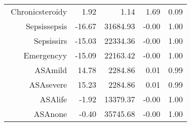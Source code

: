 \begin{tabular}{rrrrr}
$$  Chronic\-steroid\-y & 1.92 & 1.14 & 1.69 & 0.09 \\ 
  Sepsis\-sepsis & -16.67 & 31684.93 & -0.00 & 1.00 \\ 
  Sepsis\-sirs & -15.03 & 22334.36 & -0.00 & 1.00 \\ 
  Emergency\-y & -15.09 & 22163.42 & -0.00 & 1.00 \\ 
  ASA\-mild & 14.78 & 2284.86 & 0.01 & 0.99 \\ 
  ASA\-severe & 15.23 & 2284.86 & 0.01 & 0.99 \\ 
  ASA\-life & -1.92 & 13379.37 & -0.00 & 1.00 \\ 
  ASA\-none & -0.40 & 35745.68 & -0.00 & 1.00 \\ 
   \hline
\end{tabular}

